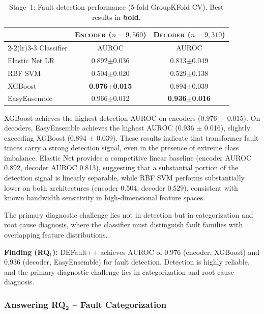 \begin{table}[!ht]
\centering
\caption{Stage~1: Fault detection performance (5-fold GroupKFold CV). Best results in \textbf{bold}.}
\label{tab:detection}
\small
\setlength{\tabcolsep}{4pt}
\begin{tabular}{l cc}
\toprule
& \textsc{Encoder} ($n\!=\!9{,}560$) & \textsc{Decoder} ($n\!=\!9{,}310$) \\
\cmidrule(lr){2-2}\cmidrule(lr){3-3}
Classifier & AUROC & AUROC \\
\midrule
Elastic Net LR & 0.892$\pm$0.036 & 0.813$\pm$0.049 \\
RBF SVM & 0.504$\pm$0.020 & 0.529$\pm$0.138 \\
XGBoost & \textbf{0.976$\pm$0.015} & 0.894$\pm$0.039 \\
EasyEnsemble & 0.966$\pm$0.012 & \textbf{0.936$\pm$0.016} \\
\bottomrule
\end{tabular}
\end{table}

XGBoost achieves the highest detection AUROC on encoders (0.976 $\pm$ 0.015). On decoders, EasyEnsemble achieves the highest AUROC (0.936 $\pm$ 0.016), slightly exceeding XGBoost (0.894 $\pm$ 0.039). These results indicate that transformer fault traces carry a strong detection signal, even in the presence of extreme class imbalance. Elastic Net provides a competitive linear baseline (encoder AUROC 0.892, decoder AUROC 0.813), suggesting that a substantial portion of the detection signal is linearly separable, while RBF SVM performs substantially lower on both architectures (encoder 0.504, decoder 0.529), consistent with known bandwidth sensitivity in high-dimensional feature spaces.

The primary diagnostic challenge lies not in detection but in categorization and root cause diagnosis, where the classifier must distinguish fault families with overlapping feature distributions.

\begin{tcolorbox}[colback=gray!3, colframe=gray!50, boxrule=0.3pt, left=4pt, right=4pt, top=3pt, bottom=3pt]
\textbf{Finding (RQ$_1$):} DEFault++ achieves AUROC of 0.976 (encoder, XGBoost) and 0.936 (decoder, EasyEnsemble) for fault detection. Detection is highly reliable, and the primary diagnostic challenge lies in categorization and root cause diagnosis.
\end{tcolorbox}

\subsubsection{\textbf{Answering RQ$\mathbf{_2}$} -- Fault Categorization}
\label{sec:defaultpp_rq2}

